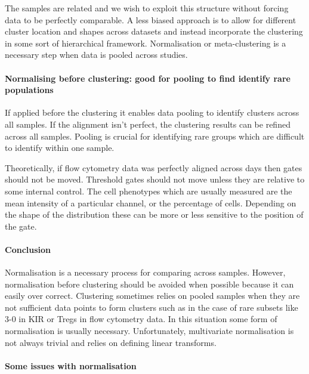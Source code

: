 The samples are related and we wish to exploit this structure without forcing data to be perfectly comparable.
A less biased approach is to allow for different cluster location and shapes across datasets and instead incorporate the clustering in some sort of hierarchical framework.  
Normalisation or meta-clustering is a necessary step when data is pooled across studies.


\paragraph{Normalising before clustering: good for pooling to find identify rare populations}

If applied before the clustering it enables data pooling to identify clusters across all samples. If the alignment isn’t perfect, the clustering results can be refined across all samples. Pooling is crucial for identifying rare groups which are difficult to identify within one sample.

Theoretically, if flow cytometry data was perfectly aligned across days then gates should not be moved.  
Threshold gates should not move unless they are relative to some internal control.
The cell phenotypes which are usually measured are the mean intensity of a particular channel, or the percentage of cells.
Depending on the shape of the distribution these can be more or less sensitive to the position of the gate.

\paragraph{Conclusion}

Normalisation is a necessary process for comparing across samples.
However, normalisation before clustering should be avoided when possible because 
it can easily over correct.
Clustering sometimes relies on pooled samples when they are not sufficient data points
to form clusters such as in the case of rare subsets like 3-0 in KIR or Tregs in flow cytometry data.
In this situation some form of normalisation is usually necessary.
Unfortunately, multivariate normalisation is not always trivial and relies on defining linear transforms. 



\paragraph{Some issues with normalisation}

